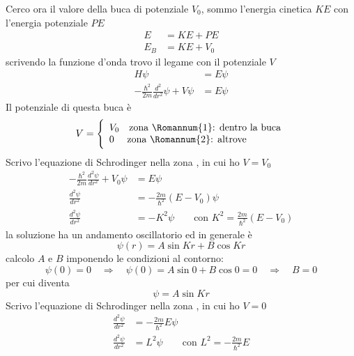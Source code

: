 Cerco ora il valore della buca di potenziale $V_0$, sommo l'energia cinetica $KE$ con l'energia potenziale $PE$
\begin{equation}
\begin{split}
E & = KE + PE \\
E_B & = KE + V_0
\end{split}
\end{equation}
scrivendo la funzione d'onda trovo il legame con il potenziale $V$
\begin{equation}
\begin{split}
H \psi & = E \psi \\
- \frac{\hbar^2}{2m} \frac{d^2}{dr^2} \psi + V \psi & = E \psi
\end{split}
\end{equation}
Il potenziale di questa buca è
\begin{equation}
V = 
\Bigg\{\begin{array}{l}
V_0 \quad\mbox{zona \Romannum{1}: dentro la buca} \\
0 \quad\mbox{ zona \Romannum{2}: altrove}
\end{array}
\end{equation}
Scrivo l'equazione di Schrodinger nella zona , in cui ho $V = V_0$
\begin{equation}
\begin{split}
- \frac{\hbar^2}{2m} \frac{d^2 \psi}{d r^2} + V_0 \psi & = E \psi \\
\frac{d^2 \psi}{d r^2} & = -\frac{2m}{\hbar^2} (E - V_0) \psi \\
\frac{d^2 \psi}{d r^2} & = - K^2 \psi \quad\quad \mbox{con } K^2 = \frac{2m}{\hbar^2} (E - V_0)
\end{split}
\end{equation}
la soluzione ha un andamento oscillatorio ed in generale è
\begin{equation}
\psi(r) = A \sin Kr + B \cos Kr
\end{equation}
calcolo $A$ e $B$ imponendo le condizioni al contorno:
\begin{equation}
\psi (0) = 0 \quad\Rightarrow\quad \psi(0) = A \sin 0 + B \cos 0 = 0 \quad\Rightarrow\quad B=0
\end{equation}
per cui diventa
\begin{equation}
\psi = A \sin K r
\label{psi_1}
\end{equation}
Scrivo l'equazione di Schrodinger nella zona , in cui ho $V =0$
\begin{equation}
\begin{split}
\frac{d^2 \psi}{d r^2} & = -\frac{2m}{\hbar^2} E \psi \\
\frac{d^2 \psi}{d r^2} & = L^2 \psi \quad\quad \mbox{con } L^2 = - \frac{2m}{\hbar^2} E
\end{split}
\end{equation}
